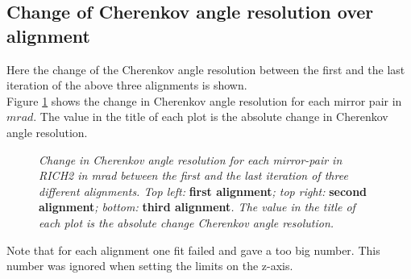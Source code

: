 \subsection{Change of Cherenkov angle resolution over alignment}
Here the change of the Cherenkov angle resolution between the first and the last iteration of the above three alignments is shown.\\
Figure \ref{fig:rich2del} shows the change in Cherenkov angle resolution for each mirror pair in $mrad$. The value in the title of each plot is the absolute change in Cherenkov angle resolution.\\
\begin{figure}[!h]
	\vspace*{-0.cm}
	\begin{center}
		\vspace*{-0.5cm}
	\end{center}
	\caption{\textit{Change in Cherenkov angle resolution for each mirror-pair in RICH2 in mrad between the first and the last iteration of three different alignments. Top left:} \textbf{first alignment}\textit{; top right:} \textbf{second alignment}\textit{; bottom:} \textbf{third alignment}\textit{. The value in the title of each plot is the absolute change Cherenkov angle resolution. } }
	\label{fig:rich2del}
\end{figure}
Note that for each alignment one fit failed and gave a too big number. This number was ignored when setting the limits on the z-axis.\\

